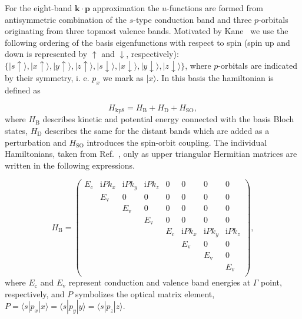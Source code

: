 For the eight-band $\mathbf{k\cdot p}$ approximation the $u$-functions are formed from antisymmetric combination of the $s$-type conduction band and three $p$-orbitals originating from three topmost valence bands. Motivated by Kane~\citep{Kane} we use the following ordering of the basis eigenfunctions with respect to spin (spin up and down is represented by $\uparrow$ and $\downarrow$, respectively): $\{|s\uparrow\rangle, |x\uparrow\rangle, |y\uparrow\rangle, |z\uparrow\rangle, |s\downarrow\rangle, |x\downarrow\rangle, |y\downarrow\rangle, |z\downarrow\rangle\}$, where $p$-orbitals are indicated by their symmetry, i. e. $p_x$ we mark as $|x\rangle$. In this basis the hamiltonian is defined as 

\begin{equation}
H_{\mathrm{kp8}}=H_\mathrm{B}+H_\mathrm{D}+H_\mathrm{SO},\label{eq:ham8kp}%
\end{equation}
where $H_{\mathrm{B}}$ describes kinetic and potential energy connected with the basis Bloch states, $H_{\mathrm{D}}$ describes the same for the distant bands which are added as a perturbation and $H_{\mathrm{SO}}$ introduces the spin-orbit coupling. The individual Hamiltonians, taken from Ref.~\citep{t_stier}, only as upper triangular Hermitian matrices are written in the following expressions.

\begin{equation}
H_\mathrm{B}=
\begin{pmatrix}
E_\mathrm{c}& \mathrm{i}Pk_x& \mathrm{i}Pk_y& \mathrm{i}Pk_z& 0& 0& 0& 0\\
& E_\mathrm{v}& 0& 0& 0& 0& 0& 0\\
& & E_\mathrm{v}& 0& 0& 0& 0& 0\\
& & & E_\mathrm{v}& 0& 0& 0& 0\\
& & & & E_\mathrm{c}& \mathrm{i}Pk_x& \mathrm{i}Pk_y& \mathrm{i}Pk_z\\
& & & & & E_\mathrm{v}& 0& 0\\
& & & & & & E_\mathrm{v}& 0\\
& & & & & & & E_\mathrm{v}\\
\end{pmatrix},
\end{equation}
where $E_\mathrm{c}$ and $E_\mathrm{v}$ represent conduction and valence band energies at $\Gamma$ point, respectively, and $P$ symbolizes the optical matrix element, $P=\langle s|p_x|x\rangle=\langle s|p_y|y\rangle=\langle s|p_z|z\rangle$.

